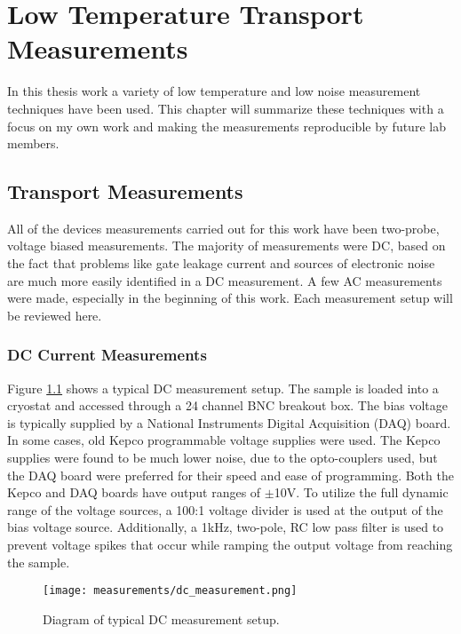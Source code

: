 \chapter{Low Temperature Transport Measurements}
\label{sec:measurement}

In this thesis work a variety of low temperature and low noise measurement techniques have been used. This chapter will summarize these techniques with a focus on my own work and making the measurements reproducible by future lab members. 

\section{Transport Measurements}

All of the devices measurements carried out for this work have been two-probe, voltage biased measurements. The majority of measurements were DC, based on the fact that problems like gate leakage current and sources of electronic noise are much more easily identified in a DC measurement. A few AC measurements were made, especially in the beginning of this work. Each measurement setup will be reviewed here.

\subsection{DC Current Measurements}
\label{sec:DC}

Figure \ref{fig:dc_measurement} shows a typical DC measurement setup. The sample is loaded into a cryostat and accessed through a 24 channel BNC breakout box. The bias voltage is typically supplied by a National Instruments Digital Acquisition (DAQ) board. In some cases, old Kepco programmable voltage supplies were used. The Kepco supplies were found to be much lower noise, due to the opto-couplers used, but the DAQ board were preferred for their speed and ease of programming. Both the Kepco and DAQ boards have output ranges of $\pm$10V. To utilize the full dynamic range of the voltage sources, a 100:1 voltage divider is used at the output of the bias voltage source. Additionally, a 1kHz, two-pole, RC low pass filter is used to prevent voltage spikes that occur while ramping the output voltage from reaching the sample.

\begin{figure}
    \centering
    \texttt{[image: measurements/dc\_measurement.png]}
    \caption{Diagram of typical DC measurement setup.}
    \label{fig:dc_measurement}
\end{figure}


